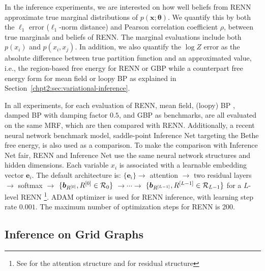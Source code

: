 In the inference experiments, we are interested on how well beliefs from RENN approximate true marginal distributions of $p(\bm{x};\bm{\theta})$. We quantify this by both the $\ell_1$ error ($\ell_1$-norm distance) and Pearson correlation coefficient $\rho$, between true marginals and beliefs of RENN. The marginal evaluations include both $p(x_i)$ and $p(x_i,x_j)$. In addition, we also quantify the $\log{Z}$ error as the absolute difference between true partition function and an approximated value, i.e., the region-based free energy for RENN or GBP while a counterpart free energy form for mean field or loopy BP as explained in Section~\ref{chpt2:sec:variational-inference}.

In all experiments, for each evaluation of RENN, mean field, (loopy) BP \cite{mooij2007sufficient}, damped BP \cite{Pretti2005damping} with damping factor $0.5$, and GBP \cite{yedida2005constucting} as benchmarks, are all evaluated on the same MRF, which are then compared with RENN. Additionally, a recent neural network benchmark model, saddle-point Inference Net \cite{NIPS2019_9687} targeting the Bethe free energy, is also used as a comparison. To make the comparison with Inference Net fair, RENN and Inference Net use the same neural network structures and hidden dimensions. Each variable $x_i$ is associated with a learnable embedding vector $\bm{e}_i$. The default architecture is: $\{\bm{e}_i\}$$\rightarrow$ attention $\rightarrow$ two residual layers $\rightarrow$ softmax $\rightarrow$ $\{\bm{b}_{R^{[0]}},R^{[0]}\in\mathcal{R}_0\}$ $\rightarrow \cdots \rightarrow$ $\{\bm{b}_{R^{[L-1]}},R^{[L-1]}\in\mathcal{R}_{L-1}\}$ for a $L$-level RENN \footnote{See \cite{AshishNIPS2017_7181} for the attention structure and \cite{DBLP:journals/corr/HeZRS15} for residual structure}. ADAM optimizer is used for RENN inference, with learning step rate $0.001$. The maximum number of optimization steps for RENN is 200.



\subsection{Inference on Grid Graphs}

